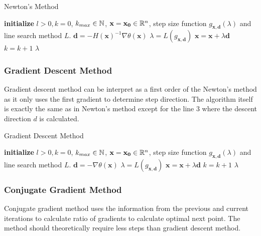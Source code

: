 \documentclass[a4paper,english,titlepage,12pt]{article}
\newcommand{\vect}[1]{\ensuremath{\mathbf{#1}}}
\newcommand{\norm}[1]{\ensuremath\Vert #1 \Vert}
\newcommand{\R}{\ensuremath\mathbb{R}}
\newcommand{\N}{\ensuremath\mathbb{N}}
\begin{document}
\begin{algorithm}[H]
\caption{Newton's Method}
\label{alg_newtons}
\begin{algorithmic}[1]
\STATE \textbf{initialize} $l > 0, k = 0$, $k_{max} \in \N$, $\vect{x} = \vect{x_0} \in \R^n$, step size function $g_{\vect{x}, \vect{d}}(\lambda)$ and line search method $L$.
\WHILE{$\norm{\nabla \theta(\vect{x})} > l$ \AND $k < k_{max}$}
    \STATE $\vect{d} = -H(\vect{x})^{-1} \nabla \theta(\vect{x})$
    \STATE $\lambda = L(g_{\vect{x}, \vect{d}})$
    \STATE $\vect{x} = \vect{x} + \lambda \vect{d}$
    \STATE $k = k + 1$
\ENDWHILE
\RETURN $\lambda$
\end{algorithmic}
\end{algorithm}


\subsubsection{Gradient Descent Method}


Gradient descent method can be interpret as a first order of the Newton's method as it only uses the first gradient to determine step direction. The algorithm itself is exactly the same as in Newton's method except for the line 3 where the descent direction $d$ is calculated.

\begin{algorithm}[H]
\caption{Gradient Descent Method}
\label{alg_gradient_descent}
\begin{algorithmic}[1]
\STATE \textbf{initialize} $l > 0, k = 0$, $k_{max} \in \N$, $\vect{x} = \vect{x_0} \in \R^n$, step size function $g_{\vect{x}, \vect{d}}(\lambda)$ and line search method $L$.
\WHILE{$\norm{\nabla \theta(\vect{x})} > l$ \AND $k < k_{max}$}
    \STATE $\vect{d} = -\nabla \theta(\vect{x})$
    \STATE $\lambda = L(g_{\vect{x}, \vect{d}})$
    \STATE $\vect{x} = \vect{x} + \lambda \vect{d}$
    \STATE $k = k + 1$
\ENDWHILE
\RETURN $\lambda$
\end{algorithmic}
\end{algorithm}


\subsubsection{Conjugate Gradient Method}


Conjugate gradient method uses the information from the previous and current iterations to calculate ratio of gradients to calculate optimal next point. The method should theoretically  require less steps than gradient descent method.
\end{document}
